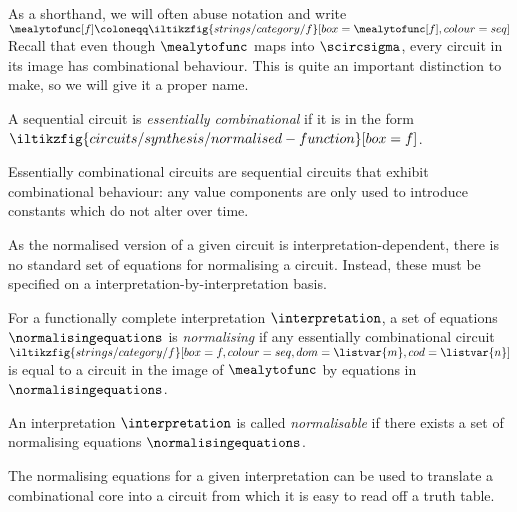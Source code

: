 As a shorthand, we will often abuse notation and write \(
\mealytofunc[f]
\coloneqq
\iltikzfig{strings/category/f}[box=\mealytofunc[f],colour=seq]
\)
Recall that even though \(\mealytofunc\) maps into \(\scircsigma\), every
circuit in its image has combinational behaviour.
This is quite an important distinction to make, so we will give it a proper
name.

\begin{lemma}
    A sequential circuit is \emph{essentially combinational} if it is in the
    form \(
    \iltikzfig{circuits/synthesis/normalised-function}[box=f]
    \).
\end{lemma}

Essentially combinational circuits are sequential circuits that exhibit
combinational behaviour: any value components are only used to introduce
constants which do not alter over time.

As the normalised version of a given circuit is interpretation-dependent, there
is no standard set of equations for normalising a circuit.
Instead, these must be specified on a interpretation-by-interpretation basis.

\begin{definition}
    For a functionally complete interpretation \(\interpretation\), a set of
    equations \(\normalisingequations\) is \emph{normalising} if any
    essentially combinational circuit \(
    \iltikzfig{strings/category/f}[box=f,colour=seq,dom=\listvar{m},cod=\listvar{n}]
    \) is equal to a circuit in the image of \(\mealytofunc\) by equations in
    \(\normalisingequations\).
\end{definition}

\begin{definition}
    An interpretation \(\interpretation\) is called \emph{normalisable} if there
    exists a set of normalising equations \(\normalisingequations\).
\end{definition}

The normalising equations for a given interpretation can be used to translate a
combinational core into a circuit from which it is easy to read off a truth
table.

